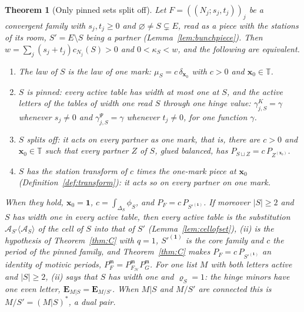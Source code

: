 \documentclass[11pt]{article}
\theoremstyle{plain}
\newtheorem{theorem}{Theorem}
\theoremstyle{definition}
\theoremstyle{remark}
\newcommand{\TT}{\mathbb T}
\newcommand{\m}{\mathfrak m}
\newcommand{\bx}{\mathbf x}
\begin{document}
\begin{theorem}[Only pinned sets split off]\label{thm:D}
Let $F=((N_j;s_j,t_j))_j$ be a convergent family with $s_j,t_j\ge0$ and $\varnothing\neq S\subsetneq E$, read as a piece with the stations of its room, $S'=E\setminus S$ being a partner (Lemma~\ref{lem:bunchpiece}). Then $w=\sum_j(s_j+t_j)c_{N_j}(S)>0$ and $0<\kappa_S<w$, and the following are equivalent.
\begin{enumerate}[label=(\roman*)]
\item The law of $S$ is the law of one mark: $\mu_S=c\,\delta_{\bx_0}$ with $c>0$ and $\bx_0\in\TT$.
\item $S$ is \emph{pinned}: every active table has width at most one at $S$, and the active letters of the tables of width one read $S$ through one hinge value: $\gamma^K_{j,S}=\gamma$ whenever $s_j\neq0$ and $\gamma^\Psi_{j,S}=\gamma$ whenever $t_j\neq0$, for one function $\gamma$.
\item $S$ \emph{splits off}: it acts on every partner as one mark, that is, there are $c>0$ and $\bx_0\in\TT$ such that every partner $Z$ of $S$, glued balanced, has $P_{S\sqcup Z}=c\,P_{Z^{(\bx_0)}}$.
\item $S$ has the station transform of $c$ times the one-mark piece at $\bx_0$ (Definition~\ref{def:transform}): it acts so on every partner on one mark.
\end{enumerate}
When they hold, $\bx_0=\mathbf 1$, $c=\int_{\Delta_S}\phi_S$, and $P_F=c\,P_{S'^{(\mathbf 1)}}$. If moreover $|S|\ge2$ and $S$ has width one in every active table, then every active table is the substitution $\mathcal A_{S'}\langle\mathcal A_S\rangle$ of the cell of $S$ into that of $S'$ (Lemma~\ref{lem:cellofset}), (ii) is the hypothesis of Theorem~\ref{thm:C} with $q=1$, $S'^{(\mathbf 1)}$ is the core family and $c$ the period of the pinned family, and Theorem~\ref{thm:C} makes $P_F=c\,P_{S'^{(\mathbf 1)}}$ an identity of motivic periods, $P_F^{\m}=P^{\m}_{F_{\mathcal H}}P^{\m}_G$. For one list $M$ with both letters active and $|S|\ge2$, (ii) says that $S$ has width one and $\varrho_S=1$: the hinge minors have one even letter, $\mathbf E_{M|S}=\mathbf E_{M/S'}$. When $M|S$ and $M/S'$ are connected this is $M/S'=(M|S)^\ast$, a dual pair.
\end{theorem}
\end{document}

